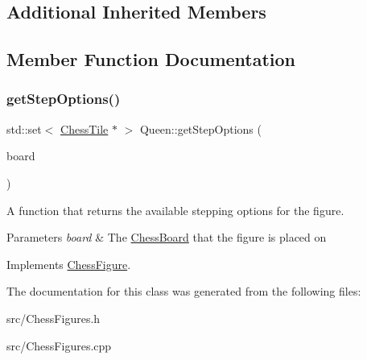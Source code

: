 \subsection*{Additional Inherited Members}


\subsection{Member Function Documentation}
\mbox{\label{classQueen_a0fe4b1feaa74c1b2879ce991771054b0}} 
\subsubsection{\texorpdfstring{get\+Step\+Options()}{getStepOptions()}}
{\footnotesize\ttfamily std\+::set$<$ \mbox{\hyperlink{classChessTile}{Chess\+Tile}} $\ast$ $>$ Queen\+::get\+Step\+Options (\begin{DoxyParamCaption}\item[{\mbox{\hyperlink{classChessBoard}{Chess\+Board}} \&}]{board }\end{DoxyParamCaption})\hspace{0.3cm}{\ttfamily [virtual]}}



A function that returns the available stepping options for the figure. 


\begin{DoxyParams}{Parameters}
{\em board} & The \mbox{\hyperlink{classChessBoard}{Chess\+Board}} that the figure is placed on \\
\hline
\end{DoxyParams}


Implements \mbox{\hyperlink{classChessFigure_ae78d52e35c4ea926f492d211c69758bd}{Chess\+Figure}}.



The documentation for this class was generated from the following files\+:\begin{DoxyCompactItemize}
\item 
src/Chess\+Figures.\+h\item 
src/Chess\+Figures.\+cpp\end{DoxyCompactItemize}
